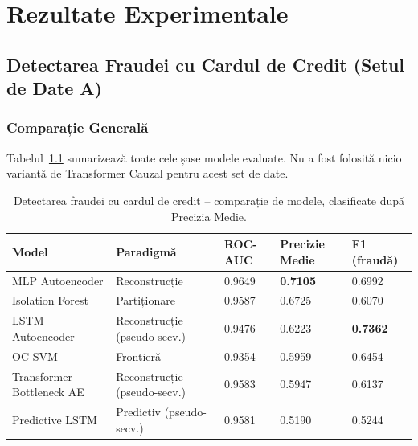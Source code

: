 \chapter{Rezultate Experimentale}
\label{ch:results}


\section{Detectarea Fraudei cu Cardul de Credit (Setul de Date A)}

\subsection{Comparație Generală}

Tabelul~\ref{tab:cc-results} sumarizează toate cele șase modele evaluate. Nu a fost folosită nicio variantă de Transformer Cauzal pentru acest set de date.

\begin{table}[h]
\centering
\begin{tabular}{@{}lllll@{}}
\toprule
Model & Paradigmă & ROC-AUC & Precizie Medie & F1 (fraudă) \\
\midrule
MLP Autoencoder            & Reconstrucție              & 0.9649 & \textbf{0.7105} & 0.6992 \\
Isolation Forest           & Partiționare                   & 0.9587 & 0.6725          & 0.6070 \\
LSTM Autoencoder           & Reconstrucție (pseudo-secv.) & 0.9476 & 0.6223          & \textbf{0.7362} \\
OC-SVM                     & Frontieră                     & 0.9354 & 0.5959          & 0.6454 \\
Transformer Bottleneck AE  & Reconstrucție (pseudo-secv.) & 0.9583 & 0.5947          & 0.6137 \\
Predictive LSTM            & Predictiv (pseudo-secv.)     & 0.9581 & 0.5190          & 0.5244 \\
\bottomrule
\end{tabular}
\caption{Detectarea fraudei cu cardul de credit -- comparație de modele, clasificate după Precizia Medie.}
\label{tab:cc-results}
\end{table}

